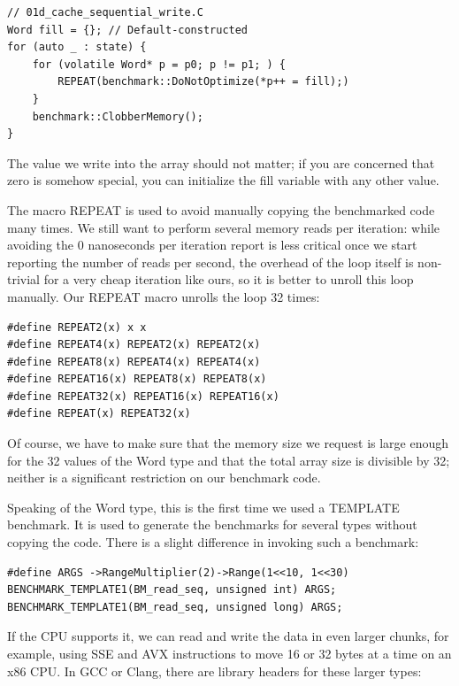 \begin{lstlisting}[style=styleCXX]
// 01d_cache_sequential_write.C
Word fill = {}; // Default-constructed
for (auto _ : state) {
	for (volatile Word* p = p0; p != p1; ) {
		REPEAT(benchmark::DoNotOptimize(*p++ = fill);)
	}
	benchmark::ClobberMemory();
}
\end{lstlisting}

The value we write into the array should not matter; if you are concerned that zero is somehow special, you can initialize the fill variable with any other value.

The macro REPEAT is used to avoid manually copying the benchmarked code many times. We still want to perform several memory reads per iteration: while avoiding the 0 nanoseconds per iteration report is less critical once we start reporting the number of reads per second, the overhead of the loop itself is non-trivial for a very cheap iteration like ours, so it is better to unroll this loop manually. Our REPEAT macro unrolls the loop 32 times:

\begin{lstlisting}[style=styleCXX]
#define REPEAT2(x) x x
#define REPEAT4(x) REPEAT2(x) REPEAT2(x)
#define REPEAT8(x) REPEAT4(x) REPEAT4(x)
#define REPEAT16(x) REPEAT8(x) REPEAT8(x)
#define REPEAT32(x) REPEAT16(x) REPEAT16(x)
#define REPEAT(x) REPEAT32(x)
\end{lstlisting}

Of course, we have to make sure that the memory size we request is large enough for the 32 values of the Word type and that the total array size is divisible by 32; neither is a significant restriction on our benchmark code.

Speaking of the Word type, this is the first time we used a TEMPLATE benchmark. It is used to generate the benchmarks for several types without copying the code. There is a slight difference in invoking such a benchmark:

\begin{lstlisting}[style=styleCXX]
#define ARGS ->RangeMultiplier(2)->Range(1<<10, 1<<30)
BENCHMARK_TEMPLATE1(BM_read_seq, unsigned int) ARGS;
BENCHMARK_TEMPLATE1(BM_read_seq, unsigned long) ARGS;
\end{lstlisting}

If the CPU supports it, we can read and write the data in even larger chunks, for example, using SSE and AVX instructions to move 16 or 32 bytes at a time on an x86 CPU. In GCC or Clang, there are library headers for these larger types:

